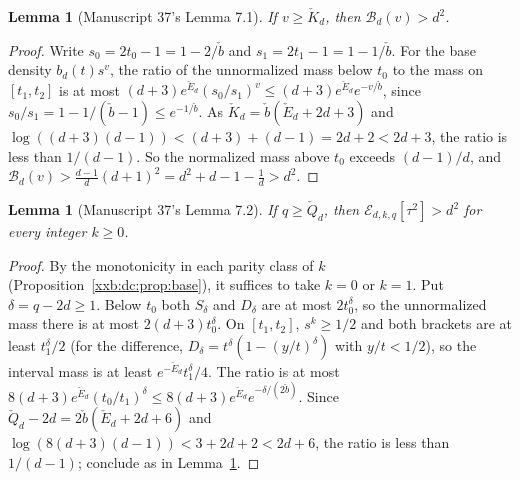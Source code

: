 \documentclass[11pt,a4paper]{article}
\numberwithin{equation}{section}
\newtheorem{lemma}[theorem]{Lemma}
\theoremstyle{definition}
\theoremstyle{remark}
\theoremstyle{plain}
\begin{document}
\begin{lemma}[Manuscript 37's Lemma 7.1]\label{xxb:d78:lem:largek}
If $v\ge\check K_d$, then $\mathcal B_d(v)>d^2$.
\end{lemma}
\begin{proof}
Write $s_0=2t_0-1=1-2/\check b$ and $s_1=2t_1-1=1-1/\check b$.  For the base
density $b_d(t)s^v$, the ratio of the unnormalized mass below $t_0$ to the mass
on $[t_1,t_2]$ is at most
$(d+3)e^{\check E_d}(s_0/s_1)^v\le(d+3)e^{\check E_d}e^{-v/\check b}$, since
$s_0/s_1=1-1/(\check b-1)\le e^{-1/\check b}$.  As
$\check K_d=\check b(\check E_d+2d+3)$ and
$\log((d+3)(d-1))<(d+3)+(d-1)=2d+2<2d+3$, the ratio is less than $1/(d-1)$.
So the normalized mass above $t_0$ exceeds $(d-1)/d$, and
$\mathcal B_d(v)>\frac{d-1}d(d+1)^2=d^2+d-1-\frac1d>d^2$.
\end{proof}

\begin{lemma}[Manuscript 37's Lemma 7.2]\label{xxb:d78:lem:largeq}
If $q\ge\check Q_d$, then $\mathcal E_{d,k,q}[\tau^2]>d^2$ for every integer
$k\ge0$.
\end{lemma}
\begin{proof}
By the monotonicity in each parity class of $k$
(Proposition~\ref{xxb:dc:prop:base}), it suffices to take $k=0$ or $k=1$.  Put
$\delta=q-2d\ge1$.  Below $t_0$ both $S_\delta$ and $D_\delta$ are at most
$2t_0^\delta$, so the unnormalized mass there is at most $2(d+3)t_0^\delta$.
On $[t_1,t_2]$, $s^k\ge1/2$ and both brackets are at least $t_1^\delta/2$ (for
the difference, $D_\delta=t^\delta(1-(y/t)^\delta)$ with $y/t<1/2$), so the
interval mass is at least $e^{-\check E_d}t_1^\delta/4$.  The ratio is at most
$8(d+3)e^{\check E_d}(t_0/t_1)^\delta\le8(d+3)e^{\check E_d}e^{-\delta/(2\check b)}$.
Since $\check Q_d-2d=2\check b(\check E_d+2d+6)$ and
$\log(8(d+3)(d-1))<3+2d+2<2d+6$, the ratio is less than $1/(d-1)$; conclude
as in Lemma~\ref{xxb:d78:lem:largek}.
\end{proof}
\end{document}
